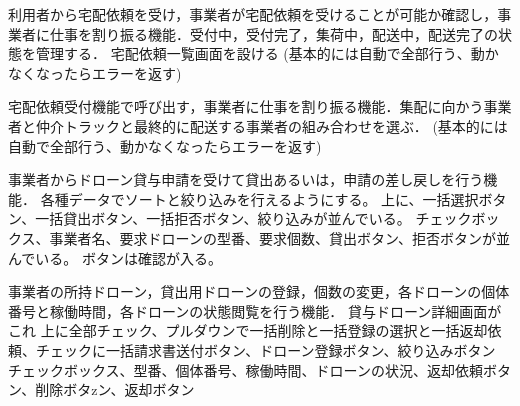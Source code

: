 \documentclass[a4paper, titlepage]{jsarticle}
\begin{document}
\begin{description}[labelwidth=\linewidth]
  \item [宅配依頼受付機能]利用者から宅配依頼を受け，事業者が宅配依頼を受けることが可能か確認し，事業者に仕事を割り振る機能．受付中，受付完了，集荷中，配送中，配送完了の状態を管理する．
  宅配依頼一覧画面を設ける
  (基本的には自動で全部行う、動かなくなったらエラーを返す)

  \item [宅配仕事割り振り機能]宅配依頼受付機能で呼び出す，事業者に仕事を割り振る機能．集配に向かう事業者と仲介トラックと最終的に配送する事業者の組み合わせを選ぶ．
  (基本的には自動で全部行う、動かなくなったらエラーを返す)

  \item [ドローン貸与機能]事業者からドローン貸与申請を受けて貸出あるいは，申請の差し戻しを行う機能．
  各種データでソートと絞り込みを行えるようにする。
  上に、一括選択ボタン、一括貸出ボタン、一括拒否ボタン、絞り込みが並んでいる。
  チェックボックス、事業者名、要求ドローンの型番、要求個数、貸出ボタン、拒否ボタンが並んでいる。
  ボタンは確認が入る。
  \item [事業者ドローン情報管理機能]事業者の所持ドローン，貸出用ドローンの登録，個数の変更，各ドローンの個体番号と稼働時間，各ドローンの状態閲覧を行う機能．
  貸与ドローン詳細画面がこれ
  上に全部チェック、プルダウンで一括削除と一括登録の選択と一括返却依頼、チェックに一括請求書送付ボタン、ドローン登録ボタン、絞り込みボタン
  チェックボックス、型番、個体番号、稼働時間、ドローンの状況、返却依頼ボタン、削除ボタzン、返却ボタン
\end{description}
\end{document}

